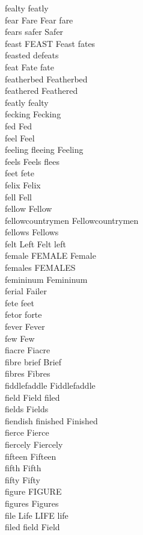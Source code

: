 fealty featly\\
fear Fare Fear fare\\
fears safer Safer\\
feast FEAST Feast fates\\
feasted defeats\\
feat Fate fate\\
featherbed Featherbed\\
feathered Feathered\\
featly fealty\\
fecking Fecking\\
fed Fed\\
feel Feel\\
feeling fleeing Feeling\\
feels Feels flees\\
feet fete\\
felix Felix\\
fell Fell\\
fellow Fellow\\
fellowcountrymen Fellowcountrymen\\
fellows Fellows\\
felt Left Felt left\\
female FEMALE Female\\
females FEMALES\\
femininum Femininum\\
ferial Failer\\
fete feet\\
fetor forte\\
fever Fever\\
few Few\\
fiacre Fiacre\\
fibre brief Brief\\
fibres Fibres\\
fiddlefaddle Fiddlefaddle\\
field Field filed\\
fields Fields\\
fiendish finished Finished\\
fierce Fierce\\
fiercely Fiercely\\
fifteen Fifteen\\
fifth Fifth\\
fifty Fifty\\
figure FIGURE\\
figures Figures\\
file Life LIFE life\\
filed field Field\\
